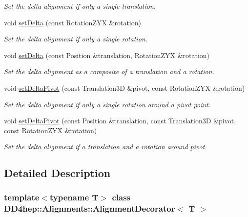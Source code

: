 \begin{DoxyCompactItemize}
\begin{DoxyCompactList}\small\item\em Set the delta alignment if only a single translation. \end{DoxyCompactList}\item 
void \hyperlink{class_d_d4hep_1_1_alignments_1_1_alignment_decorator_a27ae7e7f8aba1fed3c76ab63f985a627}{set\+Delta} (const Rotation\+Z\+YX \&rotation)
\begin{DoxyCompactList}\small\item\em Set the delta alignment if only a single rotation. \end{DoxyCompactList}\item 
void \hyperlink{class_d_d4hep_1_1_alignments_1_1_alignment_decorator_a123e789de1fa9b3c4cb0149d6831b287}{set\+Delta} (const Position \&translation, Rotation\+Z\+YX \&rotation)
\begin{DoxyCompactList}\small\item\em Set the delta alignment as a composite of a translation and a rotation. \end{DoxyCompactList}\item 
void \hyperlink{class_d_d4hep_1_1_alignments_1_1_alignment_decorator_aa162f47918e614d0c3c11e6b584d1a1b}{set\+Delta\+Pivot} (const Translation3D \&pivot, const Rotation\+Z\+YX \&rotation)
\begin{DoxyCompactList}\small\item\em Set the delta alignment if only a single rotation around a pivot point. \end{DoxyCompactList}\item 
void \hyperlink{class_d_d4hep_1_1_alignments_1_1_alignment_decorator_a5b84d2b352ba02e27815b66a94888999}{set\+Delta\+Pivot} (const Position \&translation, const Translation3D \&pivot, const Rotation\+Z\+YX \&rotation)
\begin{DoxyCompactList}\small\item\em Set the delta alignment if a translation and a rotation around pivot. \end{DoxyCompactList}\end{DoxyCompactItemize}


\subsection{Detailed Description}
\subsubsection*{template$<$typename T$>$\newline
class D\+D4hep\+::\+Alignments\+::\+Alignment\+Decorator$<$ T $>$}

